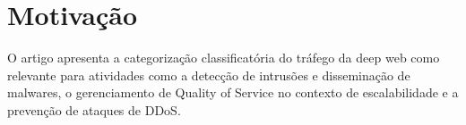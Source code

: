 \section{Motivação}

O artigo apresenta a categorização classificatória do tráfego da deep web 
como relevante para atividades como a detecção de intrusões e disseminação de
malwares, o gerenciamento de Quality of Service no contexto de escalabilidade e a 
prevenção de ataques de DDoS.